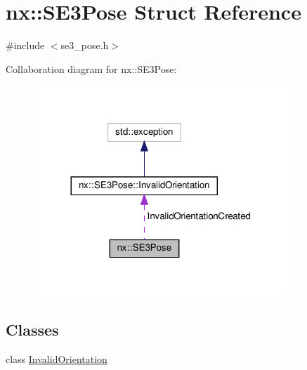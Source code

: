 \hypertarget{structnx_1_1SE3Pose}{}\section{nx\+:\+:S\+E3\+Pose Struct Reference}
\label{structnx_1_1SE3Pose}


{\ttfamily \#include $<$se3\+\_\+pose.\+h$>$}



Collaboration diagram for nx\+:\+:S\+E3\+Pose\+:
\nopagebreak
\begin{figure}[H]
\begin{center}
\leavevmode
\includegraphics[width=272pt]{structnx_1_1SE3Pose__coll__graph}
\end{center}
\end{figure}
\subsection*{Classes}
\begin{DoxyCompactItemize}
\item 
class \hyperlink{classnx_1_1SE3Pose_1_1InvalidOrientation}{Invalid\+Orientation}
\end{DoxyCompactItemize}
